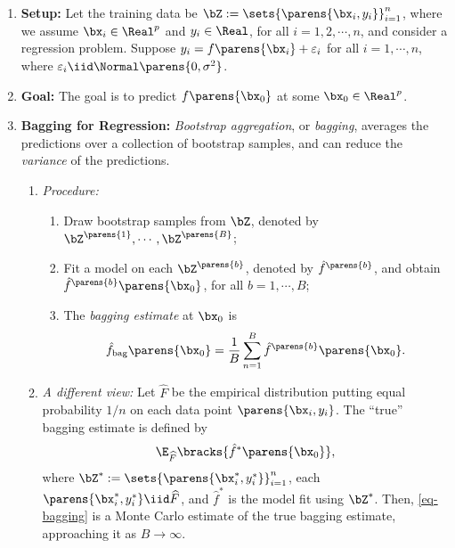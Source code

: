 \documentclass[12pt]{article}
\begin{document}
\begin{enumerate}[label=\textbf{\arabic*.}]

	\item \textbf{Setup:} Let the training data be $\bZ := \sets{\parens{\bx_i, y_i}}_{i=1}^n$, where we assume $\bx_i \in \Real^p$ and $y_i \in \Real$, for all $i = 1, 2, \cdots, n$, and consider a regression problem. Suppose $y_i = f \parens{\bx_i} + \varepsilon_i$ for all $i = 1, \cdots, n$, where $\varepsilon_i \iid \Normal \parens{0, \sigma^2}$. 
	
	\item \textbf{Goal:} The goal is to predict $f \parens{\bx_0}$ at some $\bx_0 \in \Real^p$. 
	
	\item \textbf{Bagging for Regression:} \textit{Bootstrap aggregation}, or \textit{bagging}, averages the predictions over a collection of bootstrap samples, and can reduce the \textit{variance} of the predictions. 
	\begin{enumerate}
		\item \textit{Procedure:} 
		\begin{enumerate}
			\item Draw bootstrap samples from $\bZ$, denoted by $\bZ^{\parens{1}}, \cdots, \bZ^{\parens{B}}$; 
			\item Fit a model on each $\bZ^{\parens{b}}$, denoted by $\hat{f}^{\parens{b}}$, and obtain $\hat{f}^{\parens{b}} \parens{\bx_0}$, for all $b = 1, \cdots, B$; 
			\item The \textit{bagging estimate} at $\bx_0$ is 
			\begin{align}\label{eq-bagging}
				\hat{f}_{\mathrm{bag}} \parens{\bx_0} = \frac{1}{B} \sum_{n=1}^B \hat{f}^{\parens{b}} \parens{\bx_0}. 
			\end{align}
		\end{enumerate}
		
		\item \textit{A different view:} Let $\widehat{F}$ be the empirical distribution putting equal probability $1/n$ on each data point $\parens{\bx_i, y_i}$. The ``true'' bagging estimate is defined by 
		\begin{align}
			\E_{\widehat{F}} \bracks{\hat{f}^{*} \parens{\bx_0}}, 
		\end{align}
		where $\bZ^* := \sets{\parens{\bx_i^*, y_i^*}}_{i=1}^n$, each $\parens{\bx_i^*, y_i^*} \iid \widehat{F}$, and $\hat{f}^*$ is the model fit using $\bZ^*$. Then, \eqref{eq-bagging} is a Monte Carlo estimate of the true bagging estimate, approaching it as $B \to \infty$. 
	\end{enumerate}
	

\end{enumerate}
\end{document}
